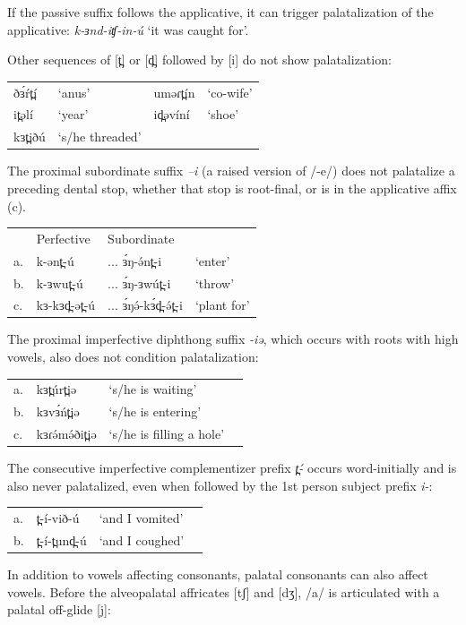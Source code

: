 If the passive suffix follows the applicative, it can trigger palatalization of the applicative: \textit{k-ɜnd-iʧ-in-ú} ‘it was caught for’.

Other sequences of [t̪] or [d̪] followed by [i] do not show palatalization:

\ea
\begin{tabular}[t]{llll}
	ðɜ́ŕt̪í	&	‘anus’	&	uməɾt̪ín	&	‘co-wife’\\
	it̪əlí	&	‘year’	&	id̪əvíní	&	‘shoe’\\
	kɜt̪iðú	&	‘s/he threaded’
\end{tabular}
\z

The proximal subordinate suffix \textit{–i} (a raised version of /-e/) does not palatalize a preceding dental stop, whether that stop is root-final, or is in the applicative affix (c).

\ea
\begin{tabular}[t]{llll}
&	Perfective	&	Subordinate\\
a.&	k-ənt̪-ú		&	... ɜ́ŋ-ə́nt̪-i		&	‘enter’\\
b.&	k-ɜwut̪-ú	&	... ɜ́ŋ-ɜwút̪-i	&	‘throw’\\
c.&	kɜ-kɜd̪-ət̪-ú	&	... ɜ́ŋə́-kɜ́d̪-ə́t̪-i	&	‘plant for’\\
\end{tabular}
\z

The proximal imperfective diphthong suffix \textit{-iə}, which occurs with roots with high vowels, also does not condition palatalization:

\ea
\begin{tabular}[t]{llll}
a.&		kɜt̪úrt̪iə	&	‘s/he is waiting’\\
b.& 	kɜvɜ́ńt̪iə	&	‘s/he is entering’\\
c.&		kɜɾə́mə́ðit̪iə	&	‘s/he is filling a hole’\\
\end{tabular}
\z

The consecutive imperfective complementizer prefix \textit{t̪-́ } occurs word-initially and is also never palatalized, even when followed by the 1st person subject prefix \textit{i-}:

\ea
\begin{tabular}[t]{llll}
a.&		t̪-í-við-ú	&	‘and I vomited’\\
b.&		t̪-í-t̪und̪-ú	&	‘and I coughed’\\
\end{tabular}
\z

In addition to vowels affecting consonants, palatal consonants can also affect vowels. Before the alveopalatal affricates [tʃ] and [dʒ], /a/ is articulated with a palatal off-glide [j]:

